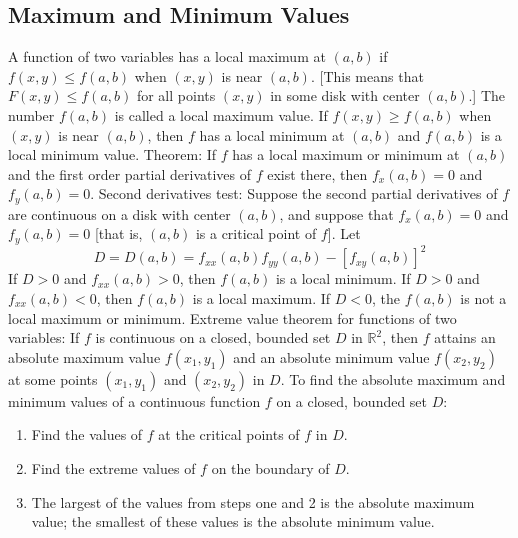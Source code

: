 \documentclass{article}
\begin{document}
        
    \subsection{Maximum and Minimum Values}
    \begin{outline}
        \1 A function of two variables has a local maximum at \((a,b)\) if \(f(x,y)\leq f(a,b)\) when \((x,y)\) is near \((a,b)\). [This means that \(F(x,y)\leq f(a,b)\) for all points \((x,y)\) in some disk with center \((a,b)\).] The number \(f(a,b)\) is called a local maximum value. If \(f(x,y)\geq f(a,b)\) when \((x,y)\) is near \((a,b)\), then $f$ has a local minimum at \((a,b)\) and \(f(a,b)\) is a local minimum value. 
        \1 Theorem: If $f$ has a local maximum or minimum at \((a,b)\) and the first order partial derivatives of $f$ exist there, then \(f_x(a,b)=0\) and \(f_y(a,b)=0\). 
        \1 Second derivatives test: Suppose the second partial derivatives of $f$ are continuous on a disk with center \((a,b)\), and suppose that \(f_x(a,b)=0\) and \(f_y(a,b)=0\) [that is, \((a,b)\) is a critical point of $f$]. Let \[D=D(a,b)=f_{xx}(a,b)f_{yy}(a,b)-[f_{xy}(a,b)]^2\]
            \2 If \(D>0\) and \(f_{xx}(a,b)>0\), then \(f(a,b)\) is a local minimum. 
            \2 If \(D>0\) and \(f_{xx}(a,b)<0\), then \(f(a,b)\) is a local maximum. 
            \2 If \(D<0\), the \(f(a,b)\) is not a local maximum or minimum. 
        \1 Extreme value theorem for functions of two variables: If $f$ is continuous on a closed, bounded set $D$ in \(\mathbb{R}^2\), then $f$ attains an absolute maximum value \(f(x_1,y_1)\) and an absolute minimum value \(f(x_2,y_2)\) at some points \((x_1,y_1)\) and \((x_2,y_2)\) in $D$. 
        \1 To find the absolute maximum and minimum values of a continuous function $f$ on a closed, bounded set $D$:
    \0 
        \begin{enumerate}
            \item Find the values of $f$ at the critical points of $f$ in $D$. 
            \item Find the extreme values of $f$ on the boundary of $D$. 
            \item The largest of the values from steps one and 2 is the absolute maximum value; the smallest of these values is the absolute minimum value. 
        \end{enumerate}

    \end{outline}
\end{document}
